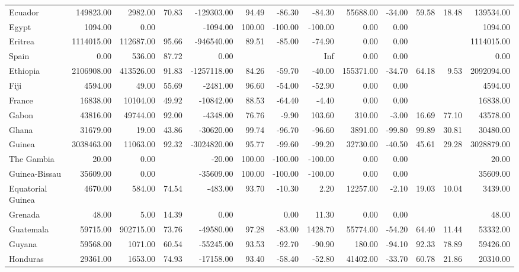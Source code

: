 \begin{table}[ht]
\begin{tabular}{lrrrrrrrrrrrr}
  Ecuador & 149823.00 & 2982.00 & 70.83 & -129303.00 & 94.49 & -86.30 & -84.30 & 55688.00 & -34.00 & 59.58 & 18.48 & 139534.00 \\ 
  Egypt & 1094.00 & 0.00 &  & -1094.00 & 100.00 & -100.00 & -100.00 & 0.00 & 0.00 &  &  & 1094.00 \\ 
  Eritrea & 1114015.00 & 112687.00 & 95.66 & -946540.00 & 89.51 & -85.00 & -74.90 & 0.00 & 0.00 &  &  & 1114015.00 \\ 
  Spain & 0.00 & 536.00 & 87.72 & 0.00 &  &  & Inf & 0.00 & 0.00 &  &  & 0.00 \\ 
  Ethiopia & 2106908.00 & 413526.00 & 91.83 & -1257118.00 & 84.26 & -59.70 & -40.00 & 155371.00 & -34.70 & 64.18 & 9.53 & 2092094.00 \\ 
  Fiji & 4594.00 & 49.00 & 55.69 & -2481.00 & 96.60 & -54.00 & -52.90 & 0.00 & 0.00 &  &  & 4594.00 \\ 
  France & 16838.00 & 10104.00 & 49.92 & -10842.00 & 88.53 & -64.40 & -4.40 & 0.00 & 0.00 &  &  & 16838.00 \\ 
  Gabon & 43816.00 & 49744.00 & 92.00 & -4348.00 & 76.76 & -9.90 & 103.60 & 310.00 & -3.00 & 16.69 & 77.10 & 43578.00 \\ 
  Ghana & 31679.00 & 19.00 & 43.86 & -30620.00 & 99.74 & -96.70 & -96.60 & 3891.00 & -99.80 & 99.89 & 30.81 & 30480.00 \\ 
  Guinea & 3038463.00 & 11063.00 & 92.32 & -3024820.00 & 95.77 & -99.60 & -99.20 & 32730.00 & -40.50 & 45.61 & 29.28 & 3028879.00 \\ 
  The Gambia & 20.00 & 0.00 &  & -20.00 & 100.00 & -100.00 & -100.00 & 0.00 & 0.00 &  &  & 20.00 \\ 
  Guinea-Bissau & 35609.00 & 0.00 &  & -35609.00 & 100.00 & -100.00 & -100.00 & 0.00 & 0.00 &  &  & 35609.00 \\ 
  Equatorial Guinea & 4670.00 & 584.00 & 74.54 & -483.00 & 93.70 & -10.30 & 2.20 & 12257.00 & -2.10 & 19.03 & 10.04 & 3439.00 \\ 
  Grenada & 48.00 & 5.00 & 14.39 & 0.00 &  & 0.00 & 11.30 & 0.00 & 0.00 &  &  & 48.00 \\ 
  Guatemala & 59715.00 & 902715.00 & 73.76 & -49580.00 & 97.28 & -83.00 & 1428.70 & 55774.00 & -54.20 & 64.40 & 11.44 & 53332.00 \\ 
  Guyana & 59568.00 & 1071.00 & 60.54 & -55245.00 & 93.53 & -92.70 & -90.90 & 180.00 & -94.10 & 92.33 & 78.89 & 59426.00 \\ 
  Honduras & 29361.00 & 1653.00 & 74.93 & -17158.00 & 93.40 & -58.40 & -52.80 & 41402.00 & -33.70 & 60.78 & 21.86 & 20310.00 \\ 

\end{tabular}
\end{table}
